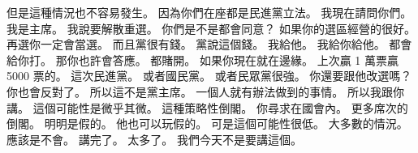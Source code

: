 \hypertarget{w01:cue:2589}{}但是這種情況也不容易發生。
\hypertarget{w01:cue:2590}{}因為你們在座都是民進黨立法。
\hypertarget{w01:cue:2591}{}我現在請問你們。
\hypertarget{w01:cue:2592}{}我是主席。
\hypertarget{w01:cue:2593}{}我說要解散重選。
\hypertarget{w01:cue:2594}{}你們是不是都會同意？
\hypertarget{w01:cue:2595}{}如果你的選區經營的很好。
\hypertarget{w01:cue:2596}{}再選你一定會當選。
\hypertarget{w01:cue:2597}{}而且黨很有錢。
\hypertarget{w01:cue:2598}{}黨說這個錢。
\hypertarget{w01:cue:2599}{}我給他。
\hypertarget{w01:cue:2600}{}我給你給他。
\hypertarget{w01:cue:2601}{}都會給你打。
\hypertarget{w01:cue:2602}{}那你也許會答應。
\hypertarget{w01:cue:2603}{}都賭開。
\hypertarget{w01:cue:2604}{}如果你現在就在邊緣。
\hypertarget{w01:cue:2605}{}上次贏 1 萬票贏 5000 票的。
\hypertarget{w01:cue:2606}{}這次民進黨。
\hypertarget{w01:cue:2607}{}或者國民黨。
\hypertarget{w01:cue:2608}{}或者民眾黨很強。
\hypertarget{w01:cue:2609}{}你還要跟他改選嗎？
\hypertarget{w01:cue:2610}{}你也會反對了。
\hypertarget{w01:cue:2611}{}所以這不是黨主席。
\hypertarget{w01:cue:2612}{}一個人就有辦法做到的事情。
\hypertarget{w01:cue:2613}{}所以我跟你講。
\hypertarget{w01:cue:2614}{}這個可能性是微乎其微。
\hypertarget{w01:cue:2615}{}這種策略性倒閣。
\hypertarget{w01:cue:2616}{}你尋求在國會內。
\hypertarget{w01:cue:2617}{}更多席次的倒閣。
\hypertarget{w01:cue:2618}{}明明是假的。
\hypertarget{w01:cue:2619}{}他也可以玩假的。
\hypertarget{w01:cue:2620}{}可是這個可能性很低。
\hypertarget{w01:cue:2621}{}大多數的情況。
\hypertarget{w01:cue:2622}{}應該是不會。
\hypertarget{w01:cue:2623}{}講完了。
\hypertarget{w01:cue:2624}{}太多了。
\hypertarget{w01:cue:2625}{}我們今天不是要講這個。

